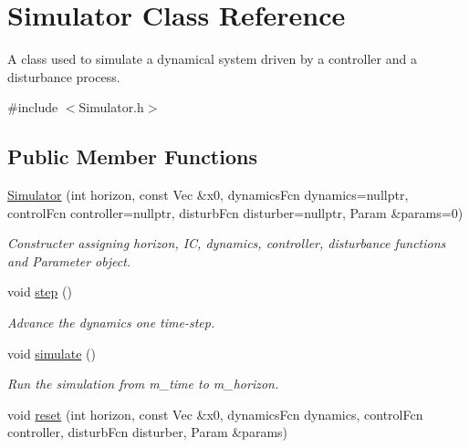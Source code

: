 \hypertarget{classSimulator}{}\section{Simulator Class Reference}
\label{classSimulator}


A class used to simulate a dynamical system driven by a controller and a disturbance process.  




{\ttfamily \#include $<$Simulator.\+h$>$}

\subsection*{Public Member Functions}
\begin{DoxyCompactItemize}
\item 
\mbox{\label{classSimulator_a4cfe319e3abf788ce05e1ddb322a904e}} 
\mbox{\hyperlink{classSimulator_a4cfe319e3abf788ce05e1ddb322a904e}{Simulator}} (int horizon, const Vec \&x0, dynamics\+Fcn dynamics=nullptr, control\+Fcn controller=nullptr, disturb\+Fcn disturber=nullptr, Param \&params=0)
\begin{DoxyCompactList}\small\item\em Constructer assigning horizon, IC, dynamics, controller, disturbance functions and Parameter object. \end{DoxyCompactList}\item 
void \mbox{\hyperlink{classSimulator_a3bdb2a9b121073e71e424203a9416b04}{step}} ()
\begin{DoxyCompactList}\small\item\em Advance the dynamics one time-\/step. \end{DoxyCompactList}\item 
\mbox{\label{classSimulator_afbc1911a12ff19714760b7791f69f178}} 
void \mbox{\hyperlink{classSimulator_afbc1911a12ff19714760b7791f69f178}{simulate}} ()
\begin{DoxyCompactList}\small\item\em Run the simulation from m\+\_\+time to m\+\_\+horizon. \end{DoxyCompactList}\item 
\mbox{\label{classSimulator_a028f379c1190c84b6af0a4824f10dad0}} 
void \mbox{\hyperlink{classSimulator_a028f379c1190c84b6af0a4824f10dad0}{reset}} (int horizon, const Vec \&x0, dynamics\+Fcn dynamics, control\+Fcn controller, disturb\+Fcn disturber, Param \&params)

\end{DoxyCompactItemize}
